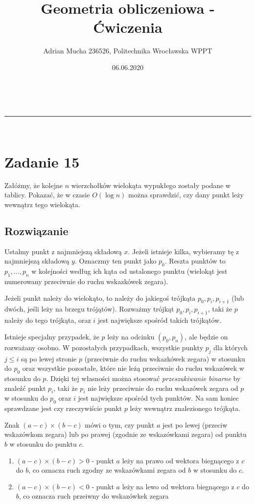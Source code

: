\documentclass[a4paper,11pt]{article}
\makeatletter
\newcommand{\linia}{\rule{\linewidth}{0.5pt}}
\theoremstyle{mytheor}
\renewcommand{\maketitle}{
\begin{center}
\vspace{2ex}
{\huge \textsc{\@title}}
\vspace{1ex}
\\
\linia\\
\@author \hfill \@date
\vspace{4ex}
\end{center}
}
\makeatother
\begin{document}
\title{Geometria obliczeniowa - Ćwiczenia}

\author{Adrian Mucha 236526, Politechnika Wrocławska WPPT}

\date{06.06.2020}

\maketitle

\section*{Zadanie 15}
Załóżmy, że kolejne $n$ wierzchołków wielokąta wypukłego zostały podane w tablicy. Pokazać, że w czasie $O(\log n)$ można sprawdzić, czy dany punkt leży wewnątrz tego wielokąta.

\subsection*{Rozwiązanie}
Ustalmy punkt z najmniejszą składową $x$. Jeżeli istnieje kilka, wybieramy tę z najmniejszą składową $y$. Oznaczmy ten punkt jako $p_0$. Reszta punktów to $p_1,\ldots, p_n$ w kolejności według ich kąta od ustalonego punktu (wielokąt jest numerowany przeciwnie do ruchu wskazkówek zegara).

Jeżeli punkt należy do wielokąto, to należy do jakiegoś trójkąta $p_0, p_i, p_{i+1}$ (lub dwóch, jeśli leży na brzegu trójątów). Rozważmy trójkąt $p_0, p_i, p_{i+1}$, taki że $p$ należy do tego trójkąta, oraz $i$ jest największe spośród takich trójkątów.

Istnieje specjalny przypadek, że $p$ leży na odcinku $(p_0, p_n)$, ale będzie on rozważany osobno. W pozostałych przypadkach, wszystkie punkty $p_j$ dla których $j\leq i$ są po lewej stronie $p$ (przeciwnie do ruchu wskazkówek zegara) w stosunku do $p_0$ oraz wszystkie pozostałe, które nie leżą przeciwnie do ruchu wskazówek w stosunku do $p$. Dzięki tej własności można stosować \textit{przeszukiwanie binarne} by znaleźć punkt $p_i$, taki że $p_i$ nie leży przeciwnie do ruchu wskazówek zegara od $p$ w stosunku do $p_0$ oraz $i$ jest największe spośród tych punktów. Na sam koniec sprawdzane jest czy rzeczywiście punkt $p$ leży wewnątrz znalezionego trójkąta.

Znak $(a-c) \times (b-c)$ mówi o tym, czy punkt $a$ jest po lewej (przeciw wskazówkom zegara) lub po prawej (zgodnie ze wskazówkami zegara) od punktu $b$ w stosunku do punktu $c$. 

\begin{enumerate}
    \item $(a-c) \times (b-c) > 0$ - punkt $a$ leży na prawo od wektora biegnącego z $c$ do $b$, co oznacza ruch zgodny ze wskazówkami zegara od $b$ w stosunku do $c$.
    \item $(a-c) \times (b-c) < 0$ - punkt $a$ leży na lewo od wektora biegnącego z $c$ do $b$, co oznacza ruch przeiwny do wskazówkek zegara
\end{enumerate}
\end{document}
